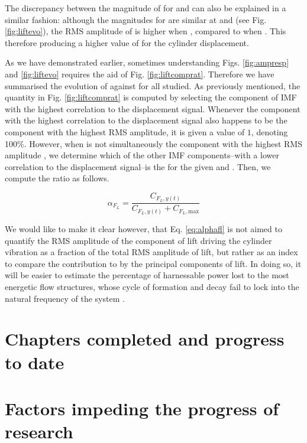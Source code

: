 \documentclass[a4paper]{article}
\begin{document}
The discrepancy between the magnitude of \flrms{} for \ptlt{} \es{} \rth{} and \rfo{} can also be explained in a similar fashion: although the magnitudes for \flrms{} are similar at \ptlt{} \es{} \rth{} and \rfo{} (see Fig. \ref{fig:liftevo}), the RMS amplitude of \cflyt{} is higher when \ptlt{} \es{} \rfo{}, compared to when \ptlt{} \es{} \rth{}. This therefore producing a higher value of \yrms{} for the cylinder displacement.

As we have demonstrated earlier, sometimes understanding Figs. \ref{fig:ampresp} and \ref{fig:liftevo} requires the aid of Fig. \ref{fig:liftcomprat}. Therefore we have summarised the evolution of \afl{} against \ured{} for all \ptlt{} studied. As previously mentioned, the quantity \afl{} in Fig. \ref{fig:liftcomprat} is computed by selecting the component of IMF with the highest correlation to the displacement signal. Whenever the component with the highest correlation to the displacement signal \cflyt{} also happens to be the component with the highest RMS amplitude, it is given a value of $1$, denoting 100\%. However, when \cflyt{} is not simultaneously the component with the highest RMS amplitude \cflm{}, we determine which of the other IMF components--with a lower correlation to the displacement signal--is the \cflm{} for the given \ured{} and \ptlt{}. Then, we compute the ratio \afl{} as follows.

\begin{equation}
  \alpha_{F_{L}}=\frac{C_{F_{L},y(t)}}{C_{F_{L},y(t)} + C_{F_{L},\text{max}}}
  \label{eq:alphafl}
\end{equation}

We would like to make it clear however, that Eq. \ref{eq:alphafl} is not aimed to quantify the RMS amplitude of the component of lift driving the cylinder vibration as a fraction of the total RMS amplitude of lift, but rather as an index to compare the contribution to \flrms{} by the principal components of lift. In doing so, it will be easier to estimate the percentage of harnessable power lost to the most energetic flow structures, whose cycle of formation and decay fail to lock into the natural frequency of the system \fn{}.

\newpage

\section{Chapters completed and progress to date}

\section{Factors impeding the progress of research}

\printbibliography
\end{document}
